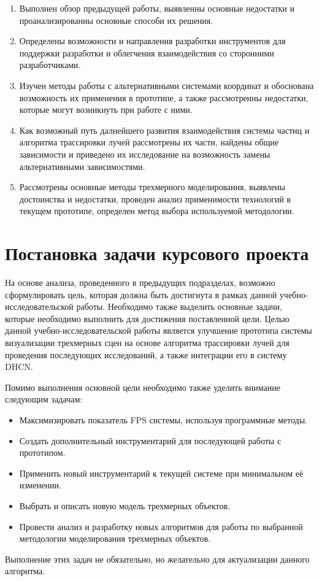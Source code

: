 \begin{enumerate}
	\item Выполнен обзор предыдущей работы, выявленны основные недостатки и проанализированны основные способи их решения.
	\item Определены возможности и направления разработки инструментов для поддержки разработки и облегчения взаимодействия со сторонними разработчиками.
	\item Изучен методы работы с альтернативными системами координат и обоснована возможность их применения в прототипе, а также рассмотренны недостатки, которые могут возникнуть при работе с ними.
	\item Как возможный путь далнейшего развития взаимодействия системы частиц и алгоритма трассировки лучей рассмотрены их части, найдены общие зависимости и приведено их исследование на возможность замены альтернативными зависимостями.
	\item Рассмотрены основные методы трехмерного моделирования, выявлены достоинства и недостатки, проведен анализ применимости технологий в текущем прототипе, определен метод выбора используемой методологии.
\end{enumerate}



\section{Постановка задачи курсового проекта}

На основе анализа, проведенного в предыдущих подразделах, возможно сформулировать цель, которая должна быть достигнута в рамках данной учебно-исследовательской работы. Необходимо также выделить основные задачи, которые необходимо выполнить для достижения поставленной цели. Целью данной учебно-исследовательской работы является улучшение прототипа системы визуализации трехмерных сцен на основе алгоритма трассировки лучей для проведения последующих исследований, а также интеграции его в систему DHCN.

Помимо выполнения основной цели необходимо также уделить внимание следующим задачам:

\begin{itemize}
	\item Максимизировать показатель FPS системы, используя программные методы.
	\item Создать дополнительный инструментарий для последующей работы с прототипом.
	\item Применить новый инструментарий к текущей системе при минимальном её изменении.
	\item Выбрать и описать новую модель трехмерных объектов.
	\item Провести анализ и разработку новых алгоритмов для работы по выбранной методологии моделирования трехмерных объектов.
\end{itemize}

Выполнение этих задач не обязательно, но желательно для актуализации данного алгоритма.
